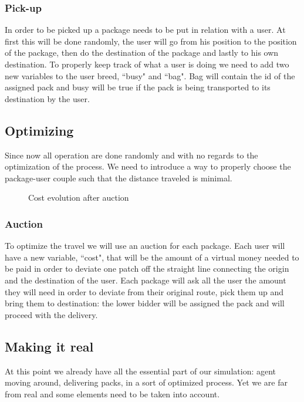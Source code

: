 \documentclass[11pt,a4paper]{article}
\begin{document}
\medskip
\subsubsection*{Pick-up}
In order to be picked up a package needs to be put in relation with a user.
At first this will be done randomly, the user will go from his position to the position of the package, then do the destination of the package and lastly to his own destination.
To properly keep track of what a user is doing we need to add two new variables to the user breed, “busy" and “bag". Bag will contain the id of the assigned pack and busy will be true if the pack is being transported to its destination by the user.

\newpage
\subsection{Optimizing}
Since now all operation are done randomly and with no regards to the optimization of the process. We need to introduce a way to properly choose the package-user couple such that the distance traveled is minimal.

\begin{figure}[h!]
\centering
\caption{Cost evolution after auction}
\end{figure}
\subsubsection*{Auction}
To optimize the travel we will use an auction for each package.
Each user will have a new variable, “cost", that will be the amount of a virtual money needed to be paid in order to deviate one patch off the straight line connecting the origin and the destination of the user.
Each package will ask all the user the amount they will need in order to deviate from their original route, pick them up and bring them to destination: the lower bidder will be assigned the pack and will proceed with the delivery.
\begin{figure}[h!]
\centering
\end{figure}
\newpage
\subsection{Making it real}
At this point we already have all the essential part of our simulation: agent moving around, delivering packs, in a sort of optimized process. Yet we are far from real and some elements need to be taken into account.
\end{document}
